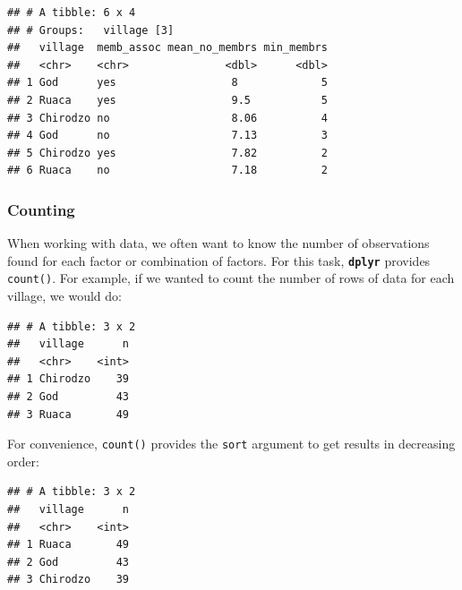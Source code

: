 \documentclass[]{book}
\newenvironment{Shaded}{\begin{snugshade}}{\end{snugshade}}
\newcommand{\KeywordTok}[1]{\textcolor[rgb]{0.13,0.29,0.53}{\textbf{#1}}}
\newcommand{\DataTypeTok}[1]{\textcolor[rgb]{0.13,0.29,0.53}{#1}}
\newcommand{\StringTok}[1]{\textcolor[rgb]{0.31,0.60,0.02}{#1}}
\newcommand{\OtherTok}[1]{\textcolor[rgb]{0.56,0.35,0.01}{#1}}
\newcommand{\OperatorTok}[1]{\textcolor[rgb]{0.81,0.36,0.00}{\textbf{#1}}}
\newcommand{\NormalTok}[1]{#1}
\begin{document}
\begin{verbatim}
## # A tibble: 6 x 4
## # Groups:   village [3]
##   village  memb_assoc mean_no_membrs min_membrs
##   <chr>    <chr>               <dbl>      <dbl>
## 1 God      yes                  8             5
## 2 Ruaca    yes                  9.5           5
## 3 Chirodzo no                   8.06          4
## 4 God      no                   7.13          3
## 5 Chirodzo yes                  7.82          2
## 6 Ruaca    no                   7.18          2
\end{verbatim}

\subsubsection{Counting}\label{counting}

When working with data, we often want to know the number of observations
found for each factor or combination of factors. For this task,
\textbf{\texttt{dplyr}} provides \texttt{count()}. For example, if we
wanted to count the number of rows of data for each village, we would
do:

\begin{Shaded}
\end{Shaded}

\begin{verbatim}
## # A tibble: 3 x 2
##   village      n
##   <chr>    <int>
## 1 Chirodzo    39
## 2 God         43
## 3 Ruaca       49
\end{verbatim}

For convenience, \texttt{count()} provides the \texttt{sort} argument to
get results in decreasing order:

\begin{Shaded}
\end{Shaded}

\begin{verbatim}
## # A tibble: 3 x 2
##   village      n
##   <chr>    <int>
## 1 Ruaca       49
## 2 God         43
## 3 Chirodzo    39
\end{verbatim}
\end{document}

